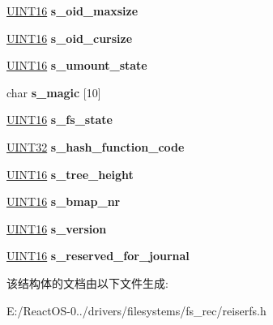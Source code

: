 \begin{DoxyCompactItemize}
\hyperlink{_processor_bind_8h_a09f1a1fb2293e33483cc8d44aefb1eb1}{U\+I\+N\+T16} {\bfseries s\+\_\+oid\+\_\+maxsize}
\item 
\mbox{\label{struct___r_f_s_d___s_u_p_e_r___b_l_o_c_k_ada4370466cc40016686119c15540885c}} 
\hyperlink{_processor_bind_8h_a09f1a1fb2293e33483cc8d44aefb1eb1}{U\+I\+N\+T16} {\bfseries s\+\_\+oid\+\_\+cursize}
\item 
\mbox{\label{struct___r_f_s_d___s_u_p_e_r___b_l_o_c_k_ac80e8a8115f6540b4d674f86e9629a28}} 
\hyperlink{_processor_bind_8h_a09f1a1fb2293e33483cc8d44aefb1eb1}{U\+I\+N\+T16} {\bfseries s\+\_\+umount\+\_\+state}
\item 
\mbox{\label{struct___r_f_s_d___s_u_p_e_r___b_l_o_c_k_ae1ca5dadef461e20aaec9618a44bb8bf}} 
char {\bfseries s\+\_\+magic} \mbox{[}10\mbox{]}
\item 
\mbox{\label{struct___r_f_s_d___s_u_p_e_r___b_l_o_c_k_a91bc20a65bae6197dbe4826ef38123a2}} 
\hyperlink{_processor_bind_8h_a09f1a1fb2293e33483cc8d44aefb1eb1}{U\+I\+N\+T16} {\bfseries s\+\_\+fs\+\_\+state}
\item 
\mbox{\label{struct___r_f_s_d___s_u_p_e_r___b_l_o_c_k_a9df0ea95ceb3193641cd0fa6fe4f8a22}} 
\hyperlink{_processor_bind_8h_ae1e6edbbc26d6fbc71a90190d0266018}{U\+I\+N\+T32} {\bfseries s\+\_\+hash\+\_\+function\+\_\+code}
\item 
\mbox{\label{struct___r_f_s_d___s_u_p_e_r___b_l_o_c_k_aa2b734309359eb1d66eb0f16ab5a6f14}} 
\hyperlink{_processor_bind_8h_a09f1a1fb2293e33483cc8d44aefb1eb1}{U\+I\+N\+T16} {\bfseries s\+\_\+tree\+\_\+height}
\item 
\mbox{\label{struct___r_f_s_d___s_u_p_e_r___b_l_o_c_k_ad8ed08958c8f1257ed8f6c89955ff1cb}} 
\hyperlink{_processor_bind_8h_a09f1a1fb2293e33483cc8d44aefb1eb1}{U\+I\+N\+T16} {\bfseries s\+\_\+bmap\+\_\+nr}
\item 
\mbox{\label{struct___r_f_s_d___s_u_p_e_r___b_l_o_c_k_aafe5a8d234051411d4dd7506ad1ddd7a}} 
\hyperlink{_processor_bind_8h_a09f1a1fb2293e33483cc8d44aefb1eb1}{U\+I\+N\+T16} {\bfseries s\+\_\+version}
\item 
\mbox{\label{struct___r_f_s_d___s_u_p_e_r___b_l_o_c_k_a28f87843c12d8f5c537f9af7ea161e76}} 
\hyperlink{_processor_bind_8h_a09f1a1fb2293e33483cc8d44aefb1eb1}{U\+I\+N\+T16} {\bfseries s\+\_\+reserved\+\_\+for\+\_\+journal}
\end{DoxyCompactItemize}


该结构体的文档由以下文件生成\+:\begin{DoxyCompactItemize}
\item 
E\+:/\+React\+O\+S-\/0../drivers/filesystems/fs\+\_\+rec/reiserfs.\+h\end{DoxyCompactItemize}
